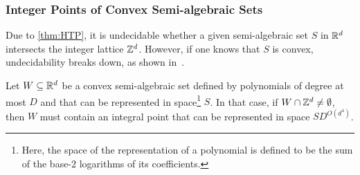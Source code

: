 \subsubsection{Integer Points of Convex Semi-algebraic Sets}

Due to \cref{thm:HTP}, it is undecidable whether a given semi-algebraic set $S$ in $\mathbb{R}^{d}$ intersects the integer lattice $\mathbb{Z}^{d}$. However, if one knows that $S$ is convex, undecidability breaks down, as shown in~\cite{KhachiyanP97}.

\begin{theorem}
\label{thm:kp}
Let $W\subseteq\mathbb{R}^{d}$ be a convex semi-algebraic set defined by
polynomials of degree at most $D$ and that can be represented in space\footnote{Here, the space of the representation of a polynomial is defined to be the sum of the base-$2$ logarithms of its coefficients.}
$S$. In that case, if $W\cap\mathbb{Z}^{d}\neq\emptyset$, then $W$ must
contain an integral point that can be represented in space
$SD^{O(d^4)}$.
\end{theorem}
